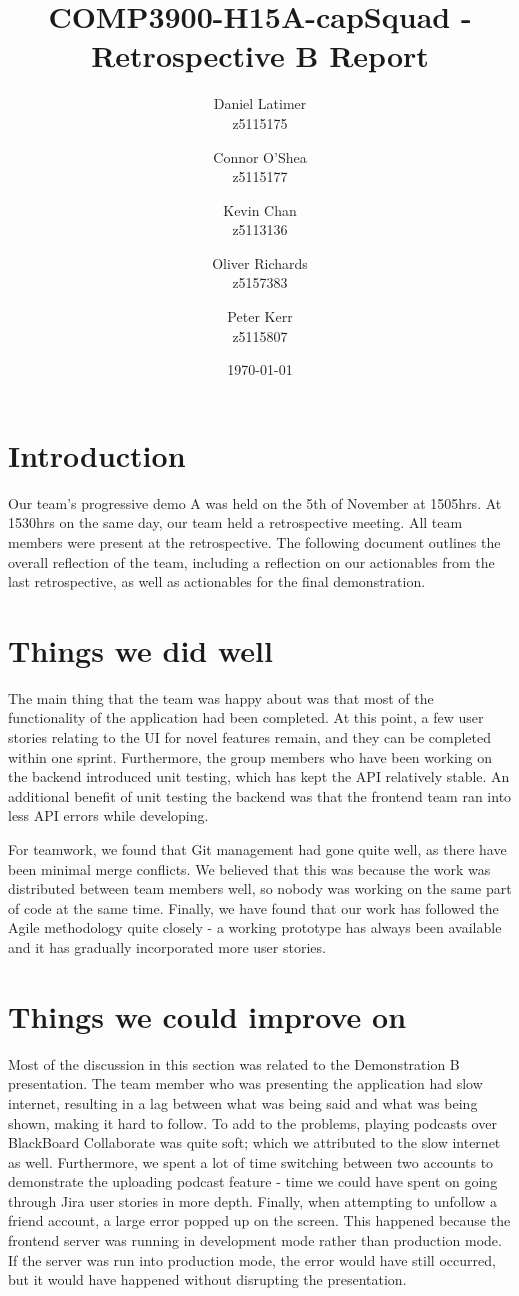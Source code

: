 \documentclass[12pt]{article}
\title{COMP3900-H15A-capSquad - Retrospective B Report}
\date{\today}
\author{
    Daniel Latimer \\ z5115175 \and
    Connor O'Shea \\ z5115177 \and
    Kevin Chan \\ z5113136 \and
    Oliver Richards \\ z5157383 \and
    Peter Kerr \\ z5115807}
\begin{document}
\maketitle
\tableofcontents
\newpage

\section{Introduction}

Our team's progressive demo A was held on the 5th of November at 1505hrs.
At 1530hrs on the same day, our team held a retrospective meeting.
All team members were present at the retrospective.
The following document outlines the overall reflection of the team, including a reflection on our actionables from the last retrospective, as well as actionables for the final demonstration.

\section{Things we did well}

The main thing that the team was happy about was that most of the functionality of the application had been completed.
At this point, a few user stories relating to the UI for novel features remain, and they can be completed within one sprint.
Furthermore, the group members who have been working on the backend introduced unit testing, which has kept the API relatively stable.
An additional benefit of unit testing the backend was that the frontend team ran into less API errors while developing.

For teamwork, we found that Git management had gone quite well, as there have been minimal merge conflicts.
We believed that this was because the work was distributed between team members well, so nobody was working on the same part of code at the same time.
Finally, we have found that our work has followed the Agile methodology quite closely - a working prototype has always been available and it has gradually incorporated more user stories.

\section{Things we could improve on}

Most of the discussion in this section was related to the Demonstration B presentation.
The team member who was presenting the application had slow internet, resulting in a lag between what was being said and what was being shown, making it hard to follow.
To add to the problems, playing podcasts over BlackBoard Collaborate was quite soft; which we attributed to the slow internet as well.
Furthermore, we spent a lot of time switching between two accounts to demonstrate the uploading podcast feature - time we could have spent on going through Jira user stories in more depth.
Finally, when attempting to unfollow a friend account, a large error popped up on the screen.
This happened because the frontend server was running in development mode rather than production mode.
If the server was run into production mode, the error would have still occurred, but it would have happened without disrupting the presentation.
\end{document}
